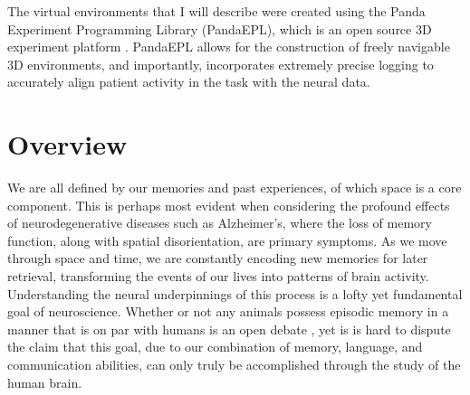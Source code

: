 The virtual environments that I will describe were created using the Panda Experiment Programming Library (PandaEPL), which is an open source 3D experiment platform \citep{SolwEtal13}. PandaEPL allows for the construction of freely navigable 3D environments, and importantly, incorporates extremely precise logging to accurately align patient activity in the task with the neural data.





\section{Overview}

We are all defined by our memories and past experiences, of which space is a core component. This is perhaps most evident when considering the profound effects of neurodegenerative diseases such as Alzheimer's, where the loss of memory function, along with spatial disorientation, are primary symptoms. As we move through space and time, we are constantly encoding new memories for later retrieval, transforming the events of our lives into patterns of brain activity. Understanding the neural underpinnings of this process is a lofty yet fundamental goal of neuroscience.
Whether or not any animals possess episodic memory in a manner that is on par with humans is an open debate \citep{ClayEtal03}, yet is is hard to dispute the claim that this goal, due to our combination of memory, language, and communication abilities, can only truly be accomplished through the study of the human brain.

